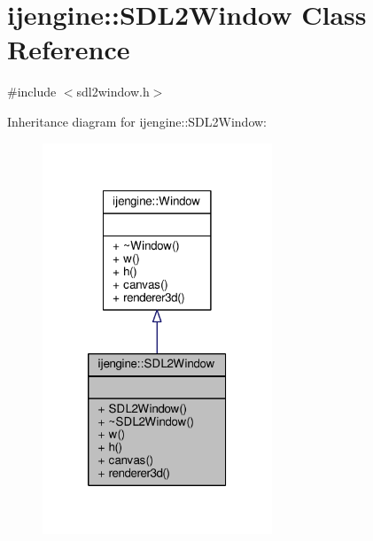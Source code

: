 \hypertarget{classijengine_1_1SDL2Window}{\section{ijengine\-:\-:S\-D\-L2\-Window Class Reference}
\label{classijengine_1_1SDL2Window}
}


{\ttfamily \#include $<$sdl2window.\-h$>$}



Inheritance diagram for ijengine\-:\-:S\-D\-L2\-Window\-:\nopagebreak
\begin{figure}[H]
\begin{center}
\leavevmode
\includegraphics[width=194pt]{classijengine_1_1SDL2Window__inherit__graph}
\end{center}
\end{figure}



